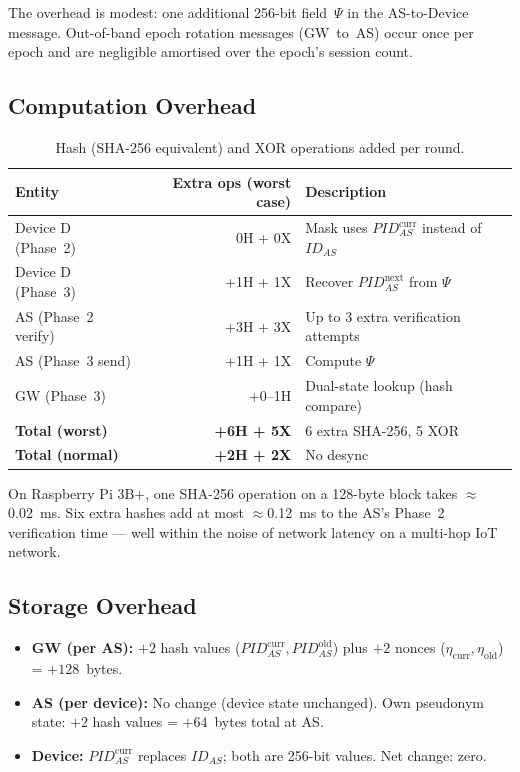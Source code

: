 \documentclass[12pt,a4paper]{article}
\newcommand{\IDas}{\mathit{ID}_{AS}}
\newcommand{\PIDas}{\mathit{PID}_{AS}}
\newcommand{\PIDascurr}{\mathit{PID}_{AS}^{\mathrm{curr}}}
\newcommand{\PIDASOld}{\mathit{PID}_{AS}^{\mathrm{old}}}
\newcommand{\etacurr}{\eta_{\mathrm{curr}}}
\newcommand{\etaold}{\eta_{\mathrm{old}}}
\begin{document}
The overhead is modest: one additional 256-bit field~$\Psi$ in the
AS-to-Device message.  Out-of-band epoch rotation messages (GW~to~AS)
occur once per epoch and are negligible amortised over the epoch's
session count.

\subsection{Computation Overhead}

\begin{table}[H]
\caption{Hash (SHA-256 equivalent) and XOR operations added per round.}
\label{tab:comp-overhead}
\centering
\renewcommand{\arraystretch}{1.3}
\begin{tabularx}{\textwidth}{@{}lrX@{}}
\toprule
\textbf{Entity} & \textbf{Extra ops (worst case)} & \textbf{Description} \\
\midrule
Device D (Phase~2) & 0H + 0X & Mask uses $\PIDascurr$ instead of $\IDas$ \\
Device D (Phase~3) & +1H + 1X & Recover $\PIDas^{\mathrm{next}}$ from $\Psi$ \\
AS (Phase~2 verify) & +3H + 3X & Up to 3 extra verification attempts \\
AS (Phase~3 send)  & +1H + 1X & Compute $\Psi$ \\
GW (Phase~3)       & +0--1H  & Dual-state lookup (hash compare) \\
\midrule
\textbf{Total (worst)} & \textbf{+6H + 5X} & 6 extra SHA-256, 5 XOR \\
\midrule
\textbf{Total (normal)} & \textbf{+2H + 2X} & No desync \\
\bottomrule
\end{tabularx}
\end{table}

On Raspberry Pi 3B+, one SHA-256 operation on a 128-byte block
takes $\approx$0.02~ms.  Six extra hashes add at most $\approx$0.12~ms
to the AS's Phase~2 verification time --- well within the noise of
network latency on a multi-hop IoT network.

\subsection{Storage Overhead}

\begin{itemize}
  \item \textbf{GW (per AS):} $+2$ hash values ($\PIDascurr, \PIDASOld$)
        plus $+2$ nonces ($\etacurr, \etaold$) = $+128$~bytes.
  \item \textbf{AS (per device):} No change (device state unchanged).
        Own pseudonym state: $+2$ hash values = $+64$~bytes total at AS.
  \item \textbf{Device:} $\PIDascurr$ replaces $\IDas$; both are
        256-bit values.  Net change: zero.
\end{itemize}
\end{document}
